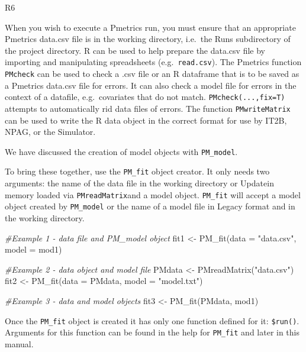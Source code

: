\documentclass[
]{book}
\newenvironment{Shaded}{\begin{snugshade}}{\end{snugshade}}
\newcommand{\AttributeTok}[1]{\textcolor[rgb]{0.77,0.63,0.00}{#1}}
\newcommand{\CommentTok}[1]{\textcolor[rgb]{0.56,0.35,0.01}{\textit{#1}}}
\newcommand{\FunctionTok}[1]{\textcolor[rgb]{0.00,0.00,0.00}{#1}}
\newcommand{\NormalTok}[1]{#1}
\newcommand{\OtherTok}[1]{\textcolor[rgb]{0.56,0.35,0.01}{#1}}
\newcommand{\StringTok}[1]{\textcolor[rgb]{0.31,0.60,0.02}{#1}}
\begin{document}
{R6}

When you wish to execute a Pmetrics run, you must ensure that an
appropriate Pmetrics data.csv file is in the working
directory, i.e.~the Runs subdirectory of the project directory. R can be
used to help prepare the data.csv file by importing and manipulating
spreadsheets (e.g.~\texttt{read.csv}). The Pmetrics function \texttt{PMcheck} can be
used to check a .csv file or an R dataframe that is to be saved as a
Pmetrics data.csv file for errors. It can also check a model file for
errors in the context of a datafile, e.g.~covariates that do not match.
\texttt{PMcheck(...,fix=T)} attempts to automatically rid data files of errors.
The function \texttt{PMwriteMatrix} can be used to write the R data object in
the correct format for use by IT2B, NPAG, or the Simulator.

We have discussed the creation of model objects with \texttt{PM\_model}.

To bring these together, use the \texttt{PM\_fit} object creator. It only needs two arguments: the name of the data file in the working directory or
{Update}in memory loaded via \texttt{PMreadMatrix}and a model object. \texttt{PM\_fit} will accept a model object created by \texttt{PM\_model} or the name of a model file in Legacy format and in the working directory.

\begin{Shaded}
\begin{Highlighting}[]
\CommentTok{\#Example 1 {-} data file and PM\_model object}
\NormalTok{fit1 }\OtherTok{\textless{}{-}} \FunctionTok{PM\_fit}\NormalTok{(}\AttributeTok{data =} \StringTok{"data.csv"}\NormalTok{, }\AttributeTok{model =}\NormalTok{ mod1)}

\CommentTok{\#Example 2 {-} data object and model file}
\NormalTok{PMdata }\OtherTok{\textless{}{-}} \FunctionTok{PMreadMatrix}\NormalTok{(}\StringTok{"data.csv"}\NormalTok{)}
\NormalTok{fit2 }\OtherTok{\textless{}{-}} \FunctionTok{PM\_fit}\NormalTok{(}\AttributeTok{data =}\NormalTok{ PMdata, }\AttributeTok{model =} \StringTok{"model.txt"}\NormalTok{)}

\CommentTok{\#Example 3 {-} data and model objects}
\NormalTok{fit3 }\OtherTok{\textless{}{-}} \FunctionTok{PM\_fit}\NormalTok{(PMdata, mod1)}
\end{Highlighting}
\end{Shaded}

Once the \texttt{PM\_fit} object is created it has only one function defined for it: \texttt{\$run()}. Arguments for this function can be found in the help for \texttt{PM\_fit} and later in this manual.
\end{document}
